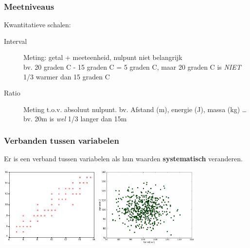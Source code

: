 \documentclass[aspectratio=169]{beamer}
\begin{document}
\begin{frame}
  \frametitle{Meetniveaus}

  Kwantitatieve schalen:

  \begin{description}
    \item[Interval] Meting: getal + meeteenheid, nulpunt niet belangrijk\\
      bv. 20 graden C - 15 graden C = 5 graden C, maar 20 graden C is \emph{NIET} 1/3 warmer dan 15 graden C
    \item[Ratio] Meting t.o.v. absoluut nulpunt. bv. Afstand (m), energie (J), massa (kg) \ldots\\
      bv. 20m is \emph{wel} 1/3 langer dan 15m
  \end{description}
\end{frame}

\begin{frame}
  \frametitle{Verbanden tussen variabelen}

  Er is een verband tussen variabelen als hun waarden \textbf{systematisch} veranderen.

  \begin{center}
    \includegraphics[height=4cm]{img/les1-08a}
    \includegraphics[height=4cm]{img/les1-08b}
  \end{center}
\end{frame}
\end{document}
